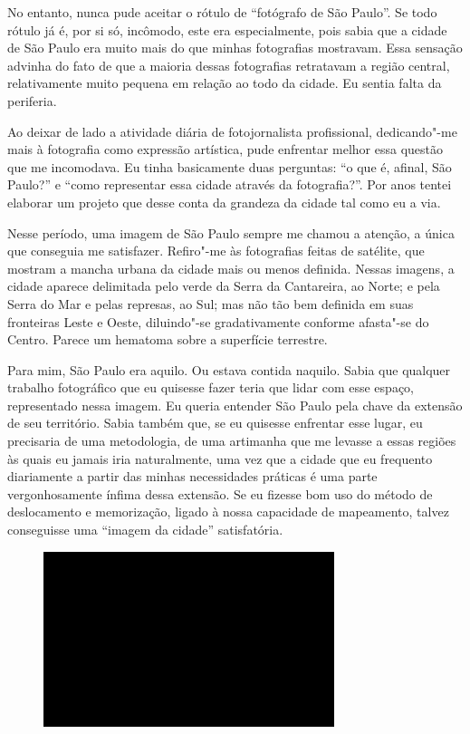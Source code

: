 No entanto, nunca pude aceitar o rótulo de ``fotógrafo de São Paulo''.
Se todo rótulo já é, por si só, incômodo, este era especialmente, pois
sabia que a cidade de São Paulo era muito mais do que minhas fotografias
mostravam. Essa sensação advinha do fato de que a maioria dessas
fotografias retratavam a região central, relativamente muito pequena em
relação ao todo da cidade. Eu sentia falta da periferia.

Ao deixar de lado a atividade diária de fotojornalista profissional,
dedicando"-me mais à fotografia como expressão artística, pude enfrentar
melhor essa questão que me incomodava. Eu tinha basicamente duas
perguntas: ``o que é, afinal, São Paulo?'' e ``como representar essa
cidade através da fotografia?''. Por anos tentei elaborar um projeto que
desse conta da grandeza da cidade tal como eu a via.

Nesse período, uma imagem de São Paulo sempre me chamou a atenção, a
única que conseguia me satisfazer. Refiro"-me às fotografias feitas de
satélite, que mostram a mancha urbana da cidade mais ou menos definida.
Nessas imagens, a cidade aparece delimitada pelo verde da Serra da
Cantareira, ao Norte; e pela Serra do Mar e pelas represas, ao Sul; mas
não tão bem definida em suas fronteiras Leste e Oeste, diluindo"-se
gradativamente conforme afasta"-se do Centro. Parece um hematoma sobre a
superfície terrestre.

Para mim, São Paulo era aquilo. Ou estava contida naquilo. Sabia que
qualquer trabalho fotográfico que eu quisesse fazer teria que lidar com
esse espaço, representado nessa imagem. Eu queria entender São Paulo
pela chave da extensão de seu território. Sabia também que, se eu
quisesse enfrentar esse lugar, eu precisaria de uma metodologia, de uma
artimanha que me levasse a essas regiões às quais eu jamais iria
naturalmente, uma vez que a cidade que eu frequento diariamente a
partir das minhas necessidades práticas é uma parte vergonhosamente
ínfima dessa extensão. Se eu fizesse bom uso do método de deslocamento e
memorização, ligado à nossa capacidade de mapeamento, talvez conseguisse
uma ``imagem da cidade'' satisfatória.

\begin{figure}[!ht]

\centering
 \includegraphics[width=85mm]{./imgs/im1.jpg}
\caption{\tiny{}}

\end{figure}

